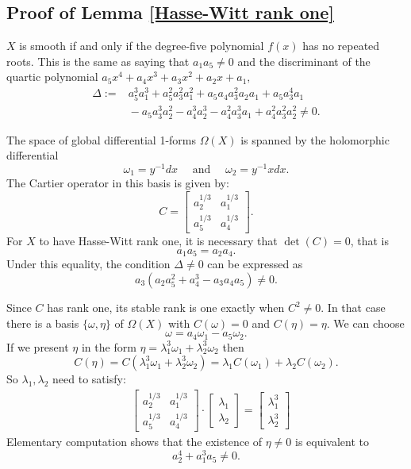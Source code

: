 \documentclass[12pt,a4]{amsart}
\theoremstyle{definition}
\begin{document}
\begin{appendix}
\section{}  
\subsection{Proof of Lemma \ref{Hasse-Witt rank one}}\label{proof_1}
$X$ is smooth if and only if the degree-five polynomial $f(x)$ has no repeated roots. This is the same as saying that $a_1a_5 \neq 0$ and the discriminant of the quartic polynomial $a_5x^4 + a_4x^3+a_3x^2+a_2x+a_1,$ 
\begin{align*}
\Delta := {}& a_5^3a_1^3+a_5^2a_3^2a_1^2+a_5a_4a_3^2a_2a_1+a_5a_3^4a_1\\
&{}-a_5a_3^3a_2^2-a_4^3a_2^3-a_4^2a_3^3a_1+a_4^2a_3^2a_2^2\ne0. 
\end{align*} 

The space of global differential 1-forms $\Omega(X)$
is spanned by the holomorphic differential 
$$ \omega_1 = y^{-1}dx \quad \text{ and } \quad  \omega_2= y^{-1}xdx.$$
The Cartier operator in this basis is given by:
$$C = \begin{bmatrix}
	a_2^{1/3} & a_1^{1/3} \\ a_5^{1/3} & a_4^{1/3}
\end{bmatrix}.
$$
For $X$ to have Hasse-Witt rank one, it is necessary that $\det(C)=0$, that is
$$a_1a_5 = a_2a_4.$$
Under this equality, the condition $\Delta\neq 0$ can be expressed as
$$a_3(a_2a_5^2+a_4^3-a_3a_4a_5)\neq 0.$$

Since $C$ has rank one, its stable rank is one exactly when $C^2\ne0$.
In that case there is a basis $\{\omega,\eta\}$ of $\Omega(X)$
with $C(\omega)=0$ and $C(\eta)=\eta$. 
We can choose
$$\omega = a_4 \omega_1 - a_5 \omega_2.$$
If we present $\eta$ in the form $\eta = \lambda_1^3 \omega_1 + \lambda_2^3 \omega_2$
then
$$C(\eta) = C(\lambda_1^3 \omega_1 + \lambda_2^3 \omega_2) = \lambda_1C(\omega_1) + \lambda_2C(\omega_2).$$
So $\lambda_1, \lambda_2$ need to satisfy:
\begin{align*} 
& \begin{bmatrix}
	a_2^{1/3} & a_1^{1/3} \\ a_5^{1/3} & a_4^{1/3}
\end{bmatrix} \cdot \begin{bmatrix}
\lambda_1 \\ \lambda_2
\end{bmatrix} = \begin{bmatrix}
\lambda_1^3 \\ \lambda_2^3
\end{bmatrix} \end{align*}
Elementary computation shows that the existence of $\eta \neq 0$ is equivalent to   
$$a_2^{4} + a_1^{3}a_5 \neq 0.$$
 

\end{appendix}
\end{document}
